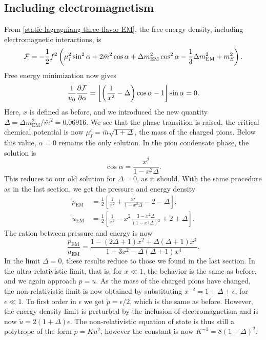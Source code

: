 \subsection{Including electromagnetism}
\label{subsection: including electromagnetism lo eos}


From \autoref{static lagragniang three-flavor EM}, the free energy density, including electromagnetic interactions, is
%
\begin{equation}
    \mathcal{F} =
    - \frac{1}{2} f^2
    \left(
        \mu_I^2 \sin^2\alpha + 2 \bar m^2\cos\alpha 
        + \Delta m_\text{EM}^2\cos^2\alpha
        - \frac{1}{3}\Delta m_\text{EM}^2 + m_S^2
    \right).
\end{equation}
%
Free energy minimization now gives
%
\begin{equation}
    \frac{1}{u_0}\pdv{\mathcal{F}}{\alpha}
    = 
    \left[ \left( \frac{1}{x^2} - \Delta \right) \cos \alpha - 1\right] \sin \alpha = 0.
\end{equation}
%
Here, $x$ is defined as before, and we introduced the new quantity $\Delta = \Delta m_{\text{EM}}^2 / \bar m^2= 0.06916$.
We see that the phase transition is raised, the critical chemical potential is now $\mu_I^c = \bar m \sqrt{1 + \Delta}$, the mass of the charged pions.
Below this value, $\alpha = 0$ remains the only solution.
In the pion condensate phase, the solution is
%
\begin{equation}
    \cos \alpha = \frac{x^2}{1 -  x^2 \Delta}.
\end{equation}
%
This reduces to our old solution for $\Delta = 0$, as it should.
With the same procedure as in the last section, we get the pressure and energy density
%
\begin{align}
    \tilde p_\text{EM} \
    & = \frac{1}{2} 
    \left[
        \frac{1}{x^2} 
        + \frac{x^2}{1 - x^2 \Delta} 
        - 2 - \Delta
    \right], \\
    \tilde u_\text{EM}
    &= \frac{1}{2} 
    \left[
        \frac{1}{x^2} 
        - x^2 \frac{3 - x^2 \Delta }{(1 - x^2 \Delta)^2}
        + 2 + \Delta
    \right].
\end{align}
%
The ration between pressure and energy is now
%
\begin{equation}
    \frac{p_\text{EM}}{u_\text{EM}} 
    = 
    \frac{
        1 - (2\Delta + 1)x^2 + \Delta(\Delta + 1)x^4
        }{
        1 + 3x^2 - \Delta (\Delta +1)x^4
        }.
\end{equation}
%
In the limit $\Delta = 0$, these results reduce to those we found in the last section.
In the ultra-relativistic limit, that is, for  $x \ll 1$, the behavior is the same as before, and we again approach $p = u$.
As the mass of the charged pions have changed, the non-relativistic limit is now obtained by substituting $x^{-2} = 1 + \Delta + \epsilon$, for $\epsilon \ll 1$.
To first order in $\epsilon$ we get $\tilde p = \epsilon / 2$, which is the same as before.
However, the energy density limit is perturbed by the inclusion of electromagnetism and is now $\tilde u = 2(1 + \Delta) \epsilon$.
The non-relativistic equation of state is thus still a polytrope of the form $p = K u^2$, however the constant is now $K^{-1} = 8 (1+\Delta)^2$.


